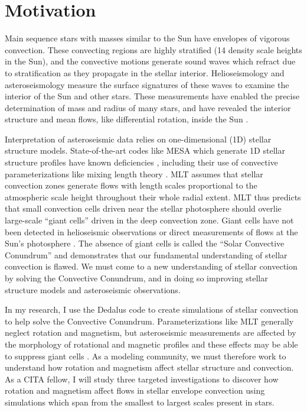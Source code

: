\documentclass[preprint, hmargin=1in, vmargin=1in]{aastex62}
\begin{document}
\maketitle
\vspace{-88pt}
\section*{\textbf{Motivation}}
\thispagestyle{fancy}
Main sequence stars with masses similar to the Sun have envelopes of vigorous convection.
These convecting regions are highly stratified (14 density scale heights in the Sun), and the convective motions generate sound waves which refract due to stratification as they propagate in the stellar interior.
Helioseismology and asteroseismology measure the surface signatures of these waves to examine the interior of the Sun and other stars.
These measurements have enabled the precise determination of mass and radius of many stars, and have revealed the interior structure and mean flows, like differential rotation, inside the Sun \citep{huber&all2019, christensen-dalsgaard2002}.


Interpretation of asteroseismic data relies on one-dimensional (1D) stellar structure models. 
State-of-the-art codes like MESA \citep{paxton&all2011} which generate 1D stellar structure profiles have known deficiencies \citep{buldgen2019}, including their use of convective parameterizations like mixing length theory \citep[MLT,][]{bohm-vitense1958}.
MLT assumes that stellar convection zones generate flows with length scales proportional to the atmospheric scale height throughout their whole radial extent.
MLT thus predicts that small convection cells driven near the stellar photosphere should overlie large-scale ``giant cells'' driven in the deep convection zone.
Giant cells have not been detected in helioseismic observations or direct measurements of flows at the Sun's photosphere \citep{hanasoge&all2015, hathaway&all2015}.
The absence of giant cells is called the ``Solar Convective Conundrum'' and demonstrates that our fundamental understanding of stellar convection is flawed.
We must come to a new understanding of stellar convection by solving the Convective Conundrum, and in doing so improving stellar structure models and asteroseismic observations.

In my research, I use the Dedalus code \citep{burns&all2019} to create simulations of stellar convection to help solve the Convective Conundrum.
Parameterizations like MLT generally neglect rotation and magnetism, but asteroseismic measurements are affected by the morphology of rotational and magnetic profiles \citep{benomar&all2018, santos&all2018} and these effects may be able to suppress giant cells \citep{featherstone&hindman2016}.
As a modeling community, we must therefore work to understand how rotation and magnetism affect stellar structure and convection.
As a CITA fellow, I will study three targeted investigations to discover how rotation and magnetism affect flows in stellar envelope convection using simulations which span from the smallest to largest scales present in stars.
\end{document}
